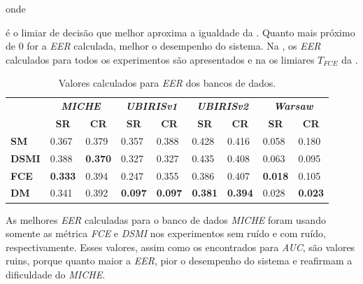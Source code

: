 
\noindent onde 


\noindent é o limiar de decisão que melhor aproxima a igualdade da . Quanto mais próximo de 0 for a \textit{\acrshort{EER}} calculada, melhor o desempenho do sistema. Na , os \textit{\acrshort{EER}} calculados para todos os experimentos são apresentados e na  os limiares $T_{FCE}$ da .

\begin{table}[h!]
\centering
\caption{Valores calculados para \textit{\acrshort{EER}} dos bancos de dados.}
\label{tab:experimentos:eer}
\tabcolsep=0.09cm
\begin{tabular}{l|l|l|l|l|l|l|l|l|}
\cline{2-9}
 & \multicolumn{2}{c|}{\textit{\textbf{MICHE}}} & \multicolumn{2}{c|}{\textit{\textbf{UBIRISv1}}} & \multicolumn{2}{c|}{\textit{\textbf{UBIRISv2}}} & \multicolumn{2}{c|}{\textit{\textbf{Warsaw}}} \\ \cline{2-9} 
 & \multicolumn{1}{c|}{\textbf{SR}} & \multicolumn{1}{c|}{\textbf{CR}} & \multicolumn{1}{c|}{\textbf{SR}} & \multicolumn{1}{c|}{\textbf{CR}} & \multicolumn{1}{c|}{\textbf{SR}} & \multicolumn{1}{c|}{\textbf{CR}} & \multicolumn{1}{c|}{\textbf{SR}} & \multicolumn{1}{c|}{\textbf{CR}} \\ \hline
\multicolumn{1}{|l|}{\textbf{SM}} & 0.367 & 0.379 & 0.357 & 0.388 & 0.428 & 0.416 & 0.058 & 0.180 \\ \hline
\multicolumn{1}{|l|}{\textbf{DSMI}} & 0.388 & \textbf{0.370} & 0.327 & 0.327 & 0.435 & 0.408 & 0.063 & 0.095 \\ \hline
\multicolumn{1}{|l|}{\textbf{FCE}} & \textbf{0.333} & 0.394 & 0.247 & 0.355 & 0.386 & 0.407 & \textbf{0.018} & 0.105 \\ \hline
\multicolumn{1}{|l|}{\textbf{DM}} & 0.341 & 0.392 & \textbf{0.097} & \textbf{0.097} & \textbf{0.381} & \textbf{0.394} & 0.028 & \textbf{0.023} \\ \hline
\end{tabular}
\end{table}

\par As melhores \textit{\acrshort{EER}} calculadas para o banco de dados \textit{MICHE} foram usando somente as métrica \textit{\acrshort{FCE}} e \textit{\acrshort{DSMI}} nos experimentos sem ruído e com ruído, respectivamente. Esses valores, assim como os encontrados para \textit{\acrshort{AUC}}, são valores ruins, porque quanto maior a \textit{\acrshort{EER}}, pior o desempenho do sistema \cite{eer, d33BEAT} e reafirmam a dificuldade do  \textit{MICHE}.

